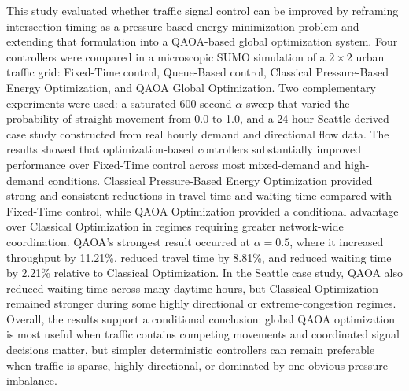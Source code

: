 \documentclass[12pt]{article}
\begin{document}
This study evaluated whether traffic signal control can be improved by reframing intersection timing as a pressure-based energy minimization problem and extending that formulation into a QAOA-based global optimization system. Four controllers were compared in a microscopic SUMO simulation of a $2 \times 2$ urban traffic grid: Fixed-Time control, Queue-Based control, Classical Pressure-Based Energy Optimization, and QAOA Global Optimization. Two complementary experiments were used: a saturated 600-second $\alpha$-sweep that varied the probability of straight movement from 0.0 to 1.0, and a 24-hour Seattle-derived case study constructed from real hourly demand and directional flow data. The results showed that optimization-based controllers substantially improved performance over Fixed-Time control across most mixed-demand and high-demand conditions. Classical Pressure-Based Energy Optimization provided strong and consistent reductions in travel time and waiting time compared with Fixed-Time control, while QAOA Optimization provided a conditional advantage over Classical Optimization in regimes requiring greater network-wide coordination. QAOA's strongest result occurred at $\alpha=0.5$, where it increased throughput by 11.21\%, reduced travel time by 8.81\%, and reduced waiting time by 2.21\% relative to Classical Optimization. In the Seattle case study, QAOA also reduced waiting time across many daytime hours, but Classical Optimization remained stronger during some highly directional or extreme-congestion regimes. Overall, the results support a conditional conclusion: global QAOA optimization is most useful when traffic contains competing movements and coordinated signal decisions matter, but simpler deterministic controllers can remain preferable when traffic is sparse, highly directional, or dominated by one obvious pressure imbalance.
\end{document}
